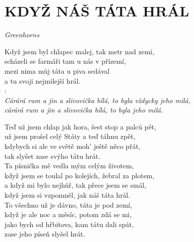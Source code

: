 \section*{\Huge KDYŽ NÁŠ TÁTA HRÁL}
\emph{Greenhorns}

Když jsem byl chlapec malej, tak metr nad zemí,\\
scházeli se farmáři tam u nás v přízemí,\\
mezi nima můj táta u piva sedával\\
a tu svoji nejmilejší hrál.\\

\textregistered:\\
\emph{
Cárárá rum a jin a slivovička bílá, to byla vždycky jeho milá,\\
cárárá rum a jin a slivovička bílá, to byla jeho milá.\\}

Teď už jsem chlap jak hora, šest stop a palců pět,\\
už jsem prošel celý Státy a teď táhnu zpět,\\
kdybych si ale ve světě moh’ ještě něco přát,\\
tak slyšet zase svýho tátu hrát. \hspace{1cm} \textregistered\\

Ta písnička mě vedla mým celým životem,\\
když jsem se toulal po kolejích, žebral za plotem,\\
a když mi bylo nejhůř, tak přece jsem se smál,\\
když jsem si vzpomněl, jak náš táta hrál.\hspace{1cm} \textregistered\\

To všechno už je dávno, táta je pod zemí,\\
když je ale noc a měsíc, potom zdá se mi,\\
jako bych od hřbitova, kam tátu dali spát,\\
zase jeho píseň slyšel hrát.\hspace{1cm} \textregistered

\newpage
